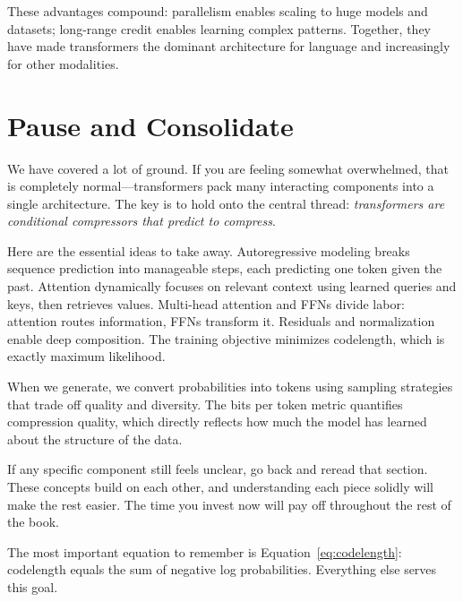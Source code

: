 These advantages compound: parallelism enables scaling to huge models and datasets; long-range credit enables learning complex patterns. Together, they have made transformers the dominant architecture for language and increasingly for other modalities.

\vspace{1.2em}

\section*{Pause and Consolidate}
\label{sec:pause}

We have covered a lot of ground. If you are feeling somewhat overwhelmed, that is completely normal---transformers pack many interacting components into a single architecture. The key is to hold onto the central thread: \emph{transformers are conditional compressors that predict to compress}.

Here are the essential ideas to take away. Autoregressive modeling breaks sequence prediction into manageable steps, each predicting one token given the past. Attention dynamically focuses on relevant context using learned queries and keys, then retrieves values. Multi-head attention and FFNs divide labor: attention routes information, FFNs transform it. Residuals and normalization enable deep composition. The training objective minimizes codelength, which is exactly maximum likelihood.

When we generate, we convert probabilities into tokens using sampling strategies that trade off quality and diversity. The bits per token metric quantifies compression quality, which directly reflects how much the model has learned about the structure of the data.

If any specific component still feels unclear, go back and reread that section. These concepts build on each other, and understanding each piece solidly will make the rest easier. The time you invest now will pay off throughout the rest of the book.

The most important equation to remember is Equation~\eqref{eq:codelength}: codelength equals the sum of negative log probabilities. Everything else serves this goal.

\vspace{2em}

